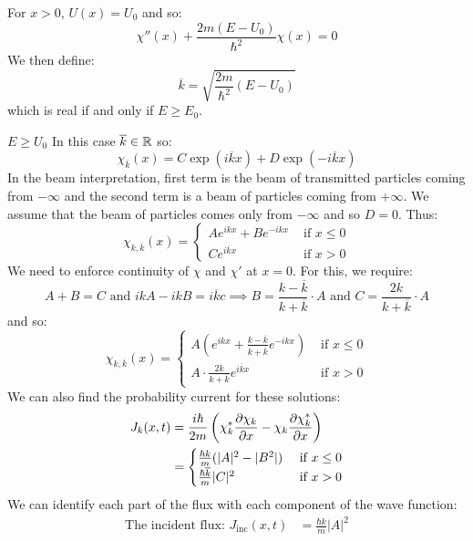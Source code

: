 \documentclass[../main.tex]{subfiles}
\begin{document}
For $x > 0$, $U(x) = U_0$ and so:
\[
  \chi''(x) + \frac{2m(E - U_0)}{\hbar^2} \chi(x) = 0
\]
We then define:
\[
  \overline{k} = \sqrt{\frac{2m}{\hbar^2}(E - U_0)}
\]
which is real if and only if $E \geq E_0$.
\begin{proofcases}
  \begin{case}{$E \geq U_0$}
    In this case $\overline{k} \in \mathbb{R}$ so:
    \[
      \chi_{\overline{k}}(x) = C\exp(i\overline{k} x) + D \exp(-i\overline{k} x)
    \]
    In the beam interpretation, first term is the beam of transmitted particles coming from $-\infty$ and the second term is a beam of particles coming from $+\infty$.
    We assume that the beam of particles comes only from $-\infty$ and so $D = 0$.
    Thus:
    \[
      \chi_{k, \overline{k}}(x) = \begin{cases}
      A e^{i k x} + Be^{-ikx} & \text{ if } x \leq 0 \\
      Ce^{i \overline{k} x} & \text{ if } x > 0
      \end{cases}
    \]
    We need to enforce continuity of $\chi$ and $\chi'$ at $x = 0$.
    For this, we require:
    \[
      A + B = C \text{ and } ikA - ikB = i \overline{k} c \implies B = \frac{k - \overline{k}}{k + \overline{k}} \cdot A \text{ and } C = \frac{2k}{k + \overline{k}} \cdot A
    \]
    and so:
    \[
      \chi_{k, \overline{k}}(x) = \begin{cases}
      A\left(e^{ikx} + \frac{k - \overline{k}}{k + \overline{k}}e^{-ikx}\right) & \text{ if } x \leq 0 \\
      A \cdot \frac{2k}{k + \overline{k}} e^{i \overline{k} x} & \text{ if } x > 0
      \end{cases}
    \]
    We can also find the probability current for these solutions:
    \begin{align*}
      J_k(x, t) &= \frac{i\hbar}{2m}\left(\chi_k^{*} \pderiv{\chi_k}{x} - \chi_k \pderiv{\chi_k^{*}}{x}\right) \\
              &= \begin{cases}
              \frac{\hbar k}{m}(|A|^2 - |B^2|) & \text{ if } x \leq 0 \\
              \frac{\hbar \overline{k}}{m} |C|^2 & \text{ if } x > 0
              \end{cases}
    \end{align*}
    We can identify each part of the flux with each component of the wave function:
    \begin{align*}
      \text{The incident flux: } J_{\text{inc}}(x, t) &= \frac{\hbar k}{m}|A|^2 \\

\end{align*}
\end{case}
\end{proofcases}
\end{document}
